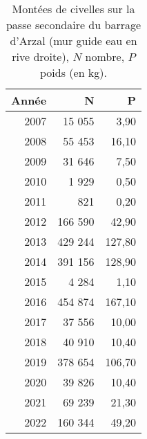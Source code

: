 \begin{table}[htbp]
\centering
\begin{tabular}{rrr}
  \hline
Année & N & P \\ 
  \hline
2007 & 15 055 & 3,90 \\ 
  2008 & 55 453 & 16,10 \\ 
  2009 & 31 646 & 7,50 \\ 
  2010 & 1 929 & 0,50 \\ 
  2011 & 821 & 0,20 \\ 
  2012 & 166 590 & 42,90 \\ 
  2013 & 429 244 & 127,80 \\ 
  2014 & 391 156 & 128,90 \\ 
  2015 & 4 284 & 1,10 \\ 
  2016 & 454 874 & 167,10 \\ 
  2017 & 37 556 & 10,00 \\ 
  2018 & 40 910 & 10,40 \\ 
  2019 & 378 654 & 106,70 \\ 
  2020 & 39 826 & 10,40 \\ 
  2021 & 69 239 & 21,30 \\ 
  2022 & 160 344 & 49,20 \\ 
   \hline
\end{tabular}
\caption{Montées de civelles sur la passe secondaire du barrage d'Arzal (mur guide eau en rive droite), $N$ nombre,
				$P$ poids (en kg).} 
\label{table_civelle_12}
\end{table}
